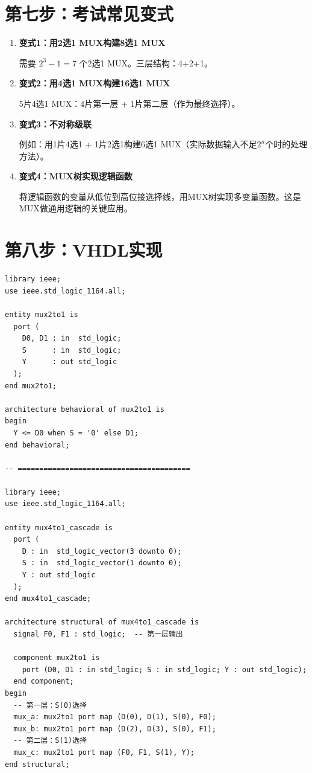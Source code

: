 \section{第七步：考试常见变式}

\begin{enumerate}
  \item \textbf{变式1：用2选1 MUX构建8选1 MUX}

  需要 $2^3 - 1 = 7$ 个2选1 MUX。三层结构：4+2+1。

  \item \textbf{变式2：用4选1 MUX构建16选1 MUX}

  5片4选1 MUX：4片第一层 + 1片第二层（作为最终选择）。

  \item \textbf{变式3：不对称级联}

  例如：用1片4选1 + 1片2选1构建6选1 MUX（实际数据输入不足$2^n$个时的处理方法）。

  \item \textbf{变式4：MUX树实现逻辑函数}

  将逻辑函数的变量从低位到高位接选择线，用MUX树实现多变量函数。这是MUX做通用逻辑的关键应用。
\end{enumerate}

\section{第八步：VHDL实现}

\begin{lstlisting}[caption={用2选1 MUX级联构建4选1 MUX（结构级）}]
library ieee;
use ieee.std_logic_1164.all;

entity mux2to1 is
  port (
    D0, D1 : in  std_logic;
    S      : in  std_logic;
    Y      : out std_logic
  );
end mux2to1;

architecture behavioral of mux2to1 is
begin
  Y <= D0 when S = '0' else D1;
end behavioral;

-- ========================================

library ieee;
use ieee.std_logic_1164.all;

entity mux4to1_cascade is
  port (
    D : in  std_logic_vector(3 downto 0);
    S : in  std_logic_vector(1 downto 0);
    Y : out std_logic
  );
end mux4to1_cascade;

architecture structural of mux4to1_cascade is
  signal F0, F1 : std_logic;  -- 第一层输出

  component mux2to1 is
    port (D0, D1 : in std_logic; S : in std_logic; Y : out std_logic);
  end component;
begin
  -- 第一层：S(0)选择
  mux_a: mux2to1 port map (D(0), D(1), S(0), F0);
  mux_b: mux2to1 port map (D(2), D(3), S(0), F1);
  -- 第二层：S(1)选择
  mux_c: mux2to1 port map (F0, F1, S(1), Y);
end structural;
\end{lstlisting}

